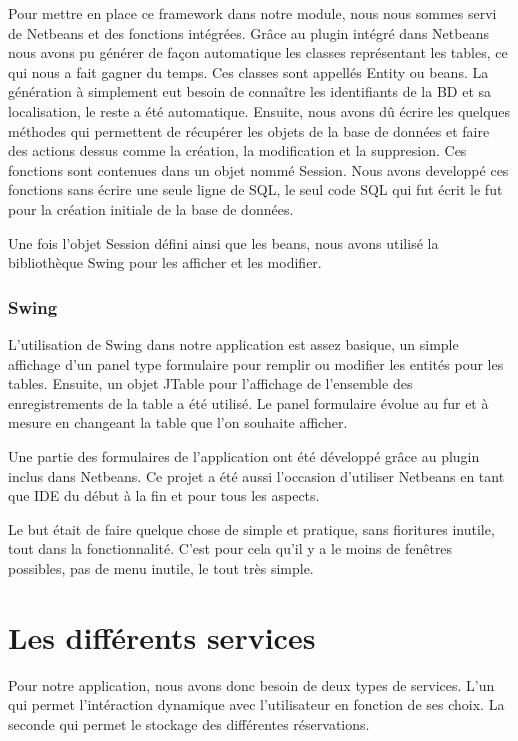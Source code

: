 \documentclass[11pt,a4paper]{article}
\begin{document}
Pour mettre en place ce framework dans notre module, nous nous sommes servi de
Netbeans et des fonctions intégrées. Grâce au plugin intégré dans Netbeans nous
avons pu générer de façon automatique les classes représentant les tables, ce qui
nous a fait gagner du temps. Ces classes sont appellés Entity ou beans. La
génération à simplement eut besoin de connaître les identifiants de la BD et sa
localisation, le reste a été automatique. Ensuite, nous avons dû écrire les
quelques méthodes qui permettent de récupérer les objets de la base de données
et faire des actions dessus comme la création, la modification et la
suppresion. Ces fonctions sont contenues dans un objet nommé Session. Nous avons
developpé ces fonctions sans écrire une seule ligne de SQL, le seul code SQL qui
fut écrit le fut pour la création initiale de la base de données.


Une fois l'objet Session défini ainsi que les beans, nous avons utilisé la
bibliothèque Swing pour les afficher et les modifier.

\clearpage
\subsubsection{Swing}

L'utilisation de Swing dans notre application est assez basique, un simple
affichage d'un panel type formulaire pour remplir ou modifier les entités pour
les tables. Ensuite, un objet JTable pour l'affichage de l'ensemble des
enregistrements de la table a été utilisé. Le panel formulaire évolue au fur et à
mesure en changeant la table que l'on souhaite afficher.

Une partie des formulaires de l'application ont été développé grâce au plugin
inclus dans Netbeans. Ce projet a été aussi l'occasion d'utiliser Netbeans en
tant que IDE du début à la fin et pour tous les aspects.

Le but était de faire quelque chose de simple et pratique, sans fioritures
inutile, tout dans la fonctionnalité. C'est pour cela qu'il y a le moins de
fenêtres possibles, pas de menu inutile, le tout très simple.




\section{Les différents services}
Pour notre application, nous avons donc besoin de deux types de services. L'un
qui permet l'intéraction dynamique avec l'utilisateur en fonction de ses
choix. La seconde qui permet le stockage des différentes réservations.
\end{document}
